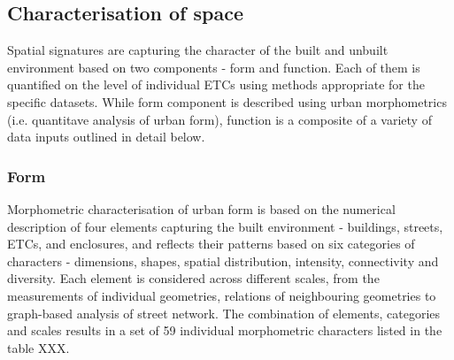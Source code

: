 \subsection*{Characterisation of space}
Spatial signatures are capturing the character of the built and unbuilt environment
based on two components - form and function. Each of them is quantified on the level of
individual ETCs using methods appropriate for the specific datasets. While form
component is described using urban morphometrics (i.e. quantitave analysis of urban
form), function is a composite of a variety of data inputs outlined in detail below.

\subsubsection*{Form}
Morphometric characterisation of urban form is based on the numerical description
of four elements capturing the built environment - buildings, streets, ETCs, and
enclosures, and reflects their patterns based on six categories of characters - dimensions, shapes, spatial
distribution, intensity, connectivity and diversity. Each element is considered across
different scales, from the measurements of individual geometries, relations of
neighbouring geometries to graph-based analysis of street network. The combination of
elements, categories and scales results in a set of 59 individual morphometric
characters listed in the table XXX.

